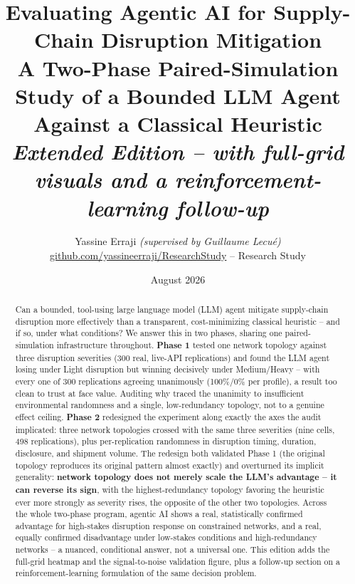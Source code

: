 \documentclass[10pt,twocolumn]{article}
\title{\vspace{-1.2em}\textbf{Evaluating Agentic AI for Supply-Chain Disruption Mitigation}\\
\large A Two-Phase Paired-Simulation Study of a Bounded LLM Agent Against a Classical Heuristic\\
\normalsize\itshape Extended Edition -- with full-grid visuals and a reinforcement-learning follow-up}
\author{\small Yassine Erraji \textit{(supervised by Guillaume Lecu\'e)} \\[-2pt] \small \href{https://github.com/yassineerraji/ResearchStudy}{github.com/yassineerraji/ResearchStudy} -- Research Study}
\date{\small August 2026}
\begin{document}
\maketitle
\vspace{-1.6em}

\begin{abstract}
\noindent Can a bounded, tool-using large language model (LLM) agent mitigate supply-chain disruption more effectively than a transparent, cost-minimizing classical heuristic -- and if so, under what conditions? We answer this in two phases, sharing one paired-simulation infrastructure throughout. \textbf{Phase 1} tested one network topology against three disruption severities (300 real, live-API replications) and found the LLM agent losing under Light disruption but winning decisively under Medium/Heavy -- with every one of 300 replications agreeing unanimously (100\%/0\% per profile), a result too clean to trust at face value. Auditing why traced the unanimity to insufficient environmental randomness and a single, low-redundancy topology, not to a genuine effect ceiling. \textbf{Phase 2} redesigned the experiment along exactly the axes the audit implicated: three network topologies crossed with the same three severities (nine cells, 498 replications), plus per-replication randomness in disruption timing, duration, disclosure, and shipment volume. The redesign both validated Phase 1 (the original topology reproduces its original pattern almost exactly) and overturned its implicit generality: \textbf{network topology does not merely scale the LLM's advantage -- it can reverse its sign}, with the highest-redundancy topology favoring the heuristic ever more strongly as severity rises, the opposite of the other two topologies. Across the whole two-phase program, agentic AI shows a real, statistically confirmed advantage for high-stakes disruption response on constrained networks, and a real, equally confirmed disadvantage under low-stakes conditions and high-redundancy networks -- a nuanced, conditional answer, not a universal one. This edition adds the full-grid heatmap and the signal-to-noise validation figure, plus a follow-up section on a reinforcement-learning formulation of the same decision problem.
\end{abstract}
\end{document}
